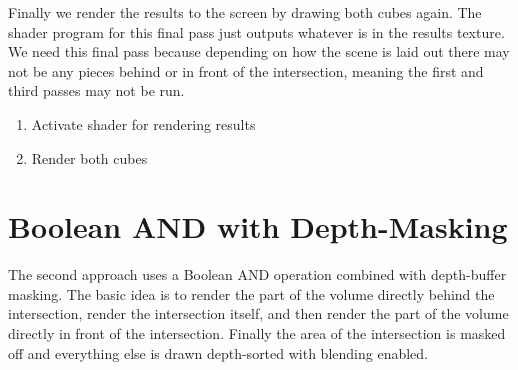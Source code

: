 \documentclass{report}
\begin{document}
Finally we render the results to the screen by drawing both cubes again.  The
shader program for this final pass just outputs whatever is in the results
texture.  We need this final pass because depending on how the scene is laid out
there may not be any pieces behind or in front of the intersection, meaning the
first and third passes may not be run.

\begin{enumerate}
  \item Activate shader for rendering results
  \item Render both cubes
\end{enumerate}

\section{Boolean AND with Depth-Masking}

The second approach uses a Boolean AND operation combined with depth-buffer
masking.  The basic idea is to render the part of the volume directly behind the
intersection, render the intersection itself, and then render the part of the
volume directly in front of the intersection.  Finally the area of the
intersection is masked off and everything else is drawn depth-sorted with
blending enabled.
\end{document}
